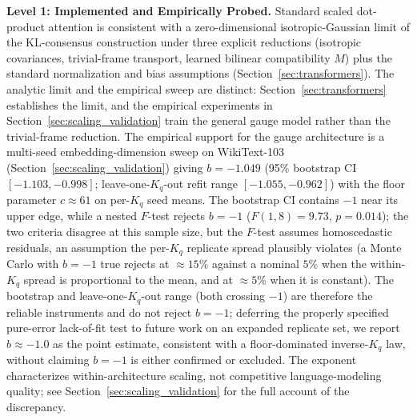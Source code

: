 \documentclass[11pt]{article}
\begin{document}
\textbf{Level 1: Implemented and Empirically Probed.} Standard scaled dot-product attention is consistent with a zero-dimensional isotropic-Gaussian limit of the KL-consensus construction under three explicit reductions (isotropic covariances, trivial-frame transport, learned bilinear compatibility $M$) plus the standard normalization and bias assumptions (Section~\ref{sec:transformers}). The analytic limit and the empirical sweep are distinct: Section~\ref{sec:transformers} establishes the limit, and the empirical experiments in Section~\ref{sec:scaling_validation} train the general gauge model rather than the trivial-frame reduction. The empirical support for the gauge architecture is a multi-seed embedding-dimension sweep on WikiText-103 (Section~\ref{sec:scaling_validation}) giving $b = -1.049$ (95\% bootstrap CI $[-1.103, -0.998]$; leave-one-$K_q$-out refit range $[-1.055, -0.962]$) with the floor parameter $c \approx 61$ on per-$K_q$ seed means. The bootstrap CI contains $-1$ near its upper edge, while a nested $F$-test rejects $b = -1$ ($F(1, 8) = 9.73$, $p = 0.014$); the two criteria disagree at this sample size, but the $F$-test assumes homoscedastic residuals, an assumption the per-$K_q$ replicate spread plausibly violates (a Monte Carlo with $b = -1$ true rejects at $\approx 15\%$ against a nominal $5\%$ when the within-$K_q$ spread is proportional to the mean, and at $\approx 5\%$ when it is constant). The bootstrap and leave-one-$K_q$-out range (both crossing $-1$) are therefore the reliable instruments and do not reject $b = -1$; deferring the properly specified pure-error lack-of-fit test to future work on an expanded replicate set, we report $b \approx -1.0$ as the point estimate, consistent with a floor-dominated inverse-$K_q$ law, without claiming $b = -1$ is either confirmed or excluded. The exponent characterizes within-architecture scaling, not competitive language-modeling quality; see Section~\ref{sec:scaling_validation} for the full account of the discrepancy.
\end{document}
